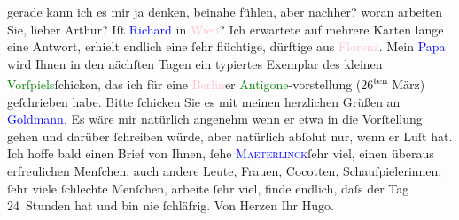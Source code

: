               gerade kann ich es mir ja denken, beinahe fühlen, aber nachher? woran arbeiten Sie,
               lieber Arthur?\pend
           \pstart
           Iſt \textcolor{blue}{Richard}{}\ledrightnote{\textcolor{blue}{Richard Beer-Hofmann}} in \textcolor{pink}{Wien}{}\ledrightnote{\textcolor{pink}{Wien}}? Ich erwartete auf mehrere Karten lange eine Antwort, erhielt endlich
               eine ſehr {\pb}flüchtige, dürftige aus
                  \textcolor{pink}{Florenz}{}\ledrightnote{\textcolor{pink}{Florenz}}.\pend
           \pstart
           Mein \textcolor{blue}{Papa}{} wird Ihnen in den
               nächſten Tagen ein typiertes Exemplar des kleinen \textcolor{green}{Vorſpiels}{}ſchicken, das ich für eine \textcolor{pink}{Berlin}{}\ledrightnote{\textcolor{pink}{Berlin}}er \textcolor{green}{Antigone}{}\ledrightnote{\textcolor{green}{Antigone}}-vorstellung
                     (26\textsuperscript{ten} März) geſchrieben habe. Bitte
               ſchicken Sie es mit meinen herzlichen Grüßen an \textcolor{blue}{Goldmann}{}\ledrightnote{\textcolor{blue}{Paul Goldmann}}. Es wäre mir natürlich angenehm {\pb}wenn er etwa in die Vorſtellung
               gehen und darüber ſchreiben würde, aber natürlich abſolut nur, wenn er Luſt hat.\pend
           \pstart
           Ich hoffe bald einen Brief von Ihnen, ſehe \textcolor{blue}{\textsc{Maeterlinck}}{}\ledrightnote{\textcolor{blue}{Maurice Maeterlinck}}{ }ſehr viel, einen überaus erfreulichen Menſchen,
               auch andere Leute, Frauen, Cocotten, Schauſpielerinnen, ſehr viele ſchlechte
               Menſchen, arbeite ſehr viel, finde endlich, daſs der Tag 24 Stunden hat und bin nie
               ſchläfrig.\pend
           \pstart Von Herzen Ihr \spacefill\mbox{Hugo.}\pend{}\endnumbering{}  
      